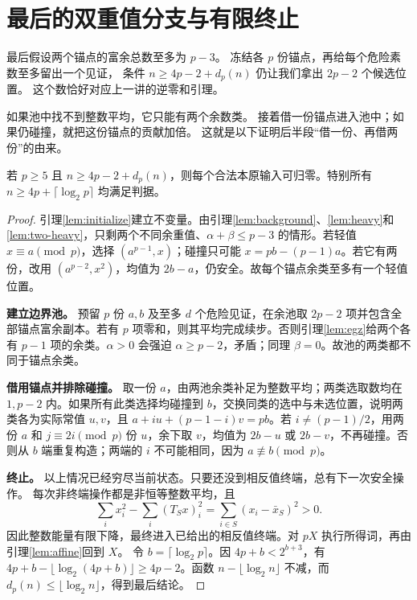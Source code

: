 \section{最后的双重值分支与有限终止}
最后假设两个锚点的富余总数至多为 $p-3$。
冻结各 $p$ 份锚点，再给每个危险素数至多留出一个见证，
条件 $n\ge4p-2+d_p(n)$ 仍让我们拿出 $2p-2$ 个候选位置。
这个数恰好对应上一讲的逆零和引理。

如果池中找不到整数平均，它只能有两个余数类。
接着借一份锚点进入池中；如果仍碰撞，就把这份锚点的贡献加倍。
这就是以下证明后半段“借一份、再借两份”的由来。

\begin{lemma}[整数下降覆盖的维数范围]\label{lem:integer-range}
若 $p\ge5$ 且 $n\ge4p-2+d_p(n)$，则每个合法本原输入可归零。特别所有 $n\ge4p+\lceil\log_2p\rceil$ 均满足判据。
\end{lemma}
\begin{proof}
引理\ref{lem:initialize}建立不变量。由引理\ref{lem:background}、\ref{lem:heavy}和\ref{lem:two-heavy}，只剩两个不同余重值、$\alpha+\beta\le p-3$ 的情形。若轻值 $x\equiv a\pmod p$，选择 $(a^{p-1},x)$；碰撞只可能 $x=pb-(p-1)a$。若它有两份，改用 $(a^{p-2},x^2)$，均值为 $2b-a$，仍安全。故每个锚点余类至多有一个轻值位置。
\par\noindent\textbf{建立边界池。}
预留 $p$ 份 $a,b$ 及至多 $d$ 个危险见证，在余池取 $2p-2$ 项并包含全部锚点富余副本。若有 $p$ 项零和，则其平均完成续步。否则引理\ref{lem:egz}给两个各有 $p-1$ 项的余类。$\alpha>0$ 会强迫 $\alpha\ge p-2$，矛盾；同理 $\beta=0$。故池的两类都不同于锚点余类。
\par\noindent\textbf{借用锚点并排除碰撞。}
取一份 $a$，由两池余类补足为整数平均；两类选取数均在 $1,p-2$ 内。如果所有此类选择均碰撞到 $b$，交换同类的选中与未选位置，说明两类各为实际常值 $u,v$，且 $a+iu+(p-1-i)v=pb$。若 $i\ne(p-1)/2$，用两份 $a$ 和 $j\equiv2i\pmod p$ 份 $u$，余下取 $v$，均值为 $2b-u$ 或 $2b-v$，不再碰撞。否则从 $b$ 端重复构造；两端的 $i$ 不可能相同，因为 $a\not\equiv b\pmod p$。
\par\noindent\textbf{终止。}
以上情况已经穷尽当前状态。只要还没到相反值终端，总有下一次安全操作。
每次非终端操作都是非恒等整数平均，且
\[\sum_i x_i^2-\sum_i(T_Sx)_i^2=\sum_{i\in S}(x_i-\bar x_S)^2>0.
\]
因此整数能量有限下降，最终进入已给出的相反值终端。对 $pX$ 执行所得词，再由引理\ref{lem:affine}回到 $X$。
令 $b=\lceil\log_2p\rceil$。因 $4p+b<2^{b+3}$，有 $4p+b-\lfloor\log_2(4p+b)\rfloor\ge4p-2$。函数 $n-\lfloor\log_2n\rfloor$ 不减，而 $d_p(n)\le\lfloor\log_2n\rfloor$，得到最后结论。
\end{proof}


